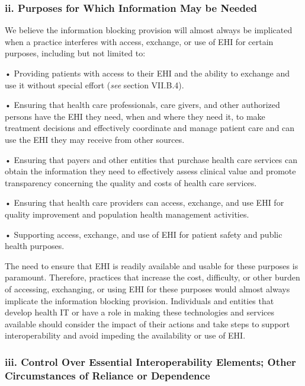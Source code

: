 \documentclass[twoside,11pt]{article}
\begin{document}
          \subsubsection{ii. Purposes for Which Information May be Needed}

          We believe the information blocking provision will almost always be implicated when a practice interferes with access, exchange, or use of EHI for certain purposes, including but not limited to:



          • Providing patients with access to their EHI and the ability to exchange and use it without special effort (\emph{see} section VII.B.4).


          • Ensuring that health care professionals, care givers, and other authorized persons have the EHI they need, when and where they need it, to make treatment decisions and effectively coordinate and manage patient care and can use the EHI they may receive from other sources.


          • Ensuring that payers and other entities that purchase health care services can obtain the information they need to effectively assess clinical value and promote transparency concerning the quality and costs of health care services.


          • Ensuring that health care providers can access, exchange, and use EHI for quality improvement and population health management activities.


          • Supporting access, exchange, and use of EHI for patient safety and public health purposes.


          The need to ensure that EHI is readily available and usable for these purposes is paramount. Therefore, practices that increase the cost, difficulty, or other burden of accessing, exchanging, or using EHI for these purposes would almost always implicate the information blocking provision. Individuals and entities that develop health IT or have a role in making these technologies and services available should consider the impact of their actions and take steps to support interoperability and avoid impeding the availability or use of EHI.


          \subsubsection{iii. Control Over Essential Interoperability Elements; Other Circumstances of Reliance or Dependence}
\end{document}
